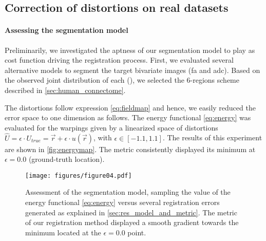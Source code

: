 \subsection{Correction of distortions on real datasets}\label{sec:results_hcp}

\paragraph*{Assessing the segmentation model}\label{sec:res_model_and_metric} %
%
Preliminarily, we investigated the aptness of our segmentation model to play as cost function
  driving the registration process.
First, we evaluated several alternative models to segment the target bivariate images
  (\gls*{fa} and \gls*{adc}).
Based on the observed joint distribution of each (),
  we selected the 6-regions scheme described in \autoref{sec:human_connectome}.

The distortions follow expression \eqref{eq:fieldmap} and hence, we easily reduced the
  error space to one dimension as follows.
The energy functional \eqref{eq:energy} was evaluated for the warpings given by
  a linearized space of distortions
  $\hat{U} = \epsilon \cdot U_{true} = \vec{r} + \epsilon \cdot u(\vec{r})$,
  with $\epsilon \in [-1.1, 1.1]$.
The results of this experiment are shown in \autoref{fig:energymap}.
The metric consistently displayed its minimum at $\epsilon=0.0$ (ground-truth location).

\begin{figure}
	\texttt{[image: figures/figure04.pdf]}
	\caption{Assessment of the segmentation model, sampling the value of the energy functional
	\eqref{eq:energy} versus several registration errors generated as explained in
	\autoref{sec:res_model_and_metric}.
	The metric of our registration method displayed a smooth gradient towards the minimum
	located at the $\epsilon = 0.0$ point.}\label{fig:energymap}
\end{figure}


